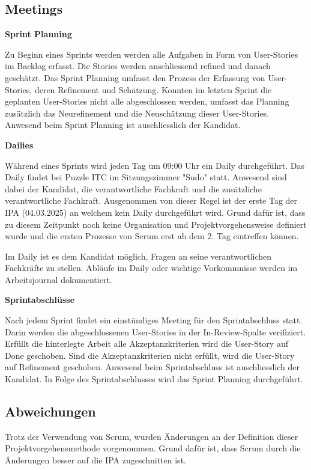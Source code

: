 \subsection{Meetings}
\textbf{Sprint Planning}

Zu Beginn eines Sprints werden werden alle Aufgaben in Form von User-Stories im Backlog erfasst.
Die Stories werden anschliessend refined und danach geschätzt. Das Sprint Planning umfasst den Prozess der Erfassung
von User-Stories, deren Refinement und Schätzung. Konnten im letzten Sprint die geplanten User-Stories nicht alle abgeschlossen werden,
umfasst das Planning zusätzlich das Neurefinement und die Neuschätzung dieser User-Stories. Anwesend beim Sprint Planning ist auschliesslich
der Kandidat.

\textbf{Dailies}

Während eines Sprints wird jeden Tag um 09:00 Uhr ein Daily durchgeführt. Das Daily findet bei Puzzle ITC
im Sitzungszimmer "Sudo" statt. Anwesend sind dabei der Kandidat, die verantwortliche Fachkraft und die zusätzliche verantwortliche
Fachkraft. Ausgenommen von dieser Regel ist der erste Tag der IPA (04.03.2025) an welchem kein Daily durchgeführt wird. Grund dafür ist, dass zu diesem Zeitpunkt noch keine
Organisation und Projektvorgehensweise definiert wurde und die ersten Prozesse von Scrum erst ab dem 2. Tag eintreffen können.

Im Daily ist es dem Kandidat möglich, Fragen an seine verantwortlichen Fachkräfte zu stellen. Abläufe im Daily oder wichtige 
Vorkommnisse werden im Arbeitsjournal dokumentiert.

\textbf{Sprintabschlüsse}
\label{sprintfinish}

Nach jedem Sprint findet ein einstündiges Meeting für den Sprintabschluss statt. Darin werden die abgeschlossenen User-Stories
in der In-Review-Spalte verifiziert. Erfüllt die hinterlegte Arbeit alle Akzeptanzkriterien wird die User-Story auf Done geschoben. 
Sind die Akzeptanzkriterien nicht erfüllt, wird die User-Story auf Refinement geschoben. Anwesend beim Sprintabschluss ist auschliesslich der Kandidat.
In Folge des Sprintabschlusses wird das Sprint Planning durchgeführt.

\subsection{Abweichungen}
Trotz der Verwendung von Scrum, wurden Änderungen an der Definition dieser Projektvorgehensmethode
vorgenommen. Grund dafür ist, dass Scrum durch die Änderungen besser auf die IPA zugeschnitten ist.

